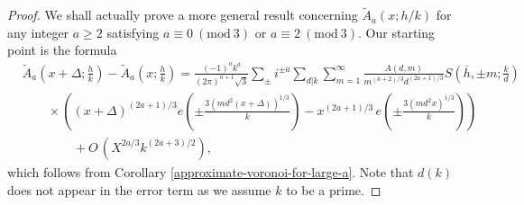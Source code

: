 \documentclass[a4paper,10pt,twoside]{amsart}
\theoremstyle{definition}
\numberwithin{equation}{section}
\renewcommand{\pmod}[1]{\ (\mathrm{mod}\ #1)}
\renewcommand\:{\colon}
\begin{document}
\begin{proof}   
We shall actually prove a more general result concerning $\widetilde A_a(x;h/k)$ for any integer $a\geqslant2$ satisfying $a\equiv0\pmod3$ or $a\equiv2\pmod3$. Our starting point is the formula
\begin{align*}   
&\widetilde A_a\left(x+\Delta;\frac hk\right)-\widetilde A_a\left(x;\frac hk\right)
=\frac{(-1)^ak^a}{(2\pi)^{a+1}\sqrt3}\sum_\pm i^{\pm a}\sum_{d|k}\sum_{m=1}^\infty\frac{A(d,m)}{m^{(a+2)/3}d^{(2a+1)/3}}S\left(\overline h,\pm m;\frac kd\right)\\
&\qquad\times\left(\left(x+\Delta\right)^{(2a+1)/3}e\!\left(\pm\frac{3(md^2(x+\Delta))^{1/3}}k\right)-x^{(2a+1)/3}\,e\!\left(\pm\frac{3(md^2x)^{1/3}}k\right)\right)\\
&\qquad\qquad+O\,\left(X^{2a/3}k^{(2a+3)/2}\right),
\end{align*}
which follows from Corollary \ref{approximate-voronoi-for-large-a}. Note that $d(k)$ does not appear in the error term as we assume $k$ to be a prime.  


\end{proof}
\end{document}
